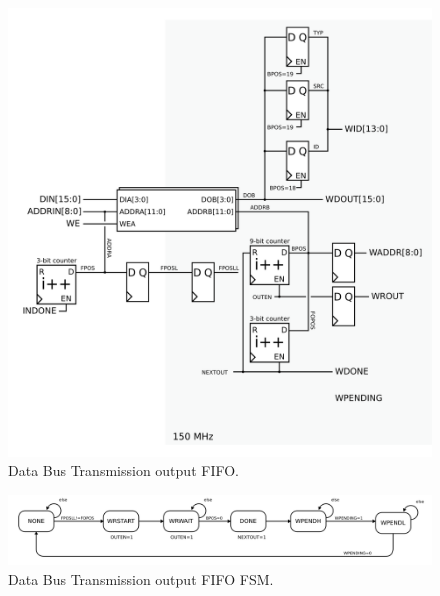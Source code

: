 \begin{figure}
\begin{centering}
\includegraphics[scale=0.8]{bufratelim.svg}
\end{centering}
\caption{Data Bus Transmission output FIFO.}
\label{data.outputfifo}
\end{figure}


\begin{figure}
\begin{centering}
\includegraphics[scale=0.8]{bufratelim.fsm.svg}
\end{centering}
\caption{Data Bus Transmission output FIFO FSM.}
\label{data.outputfifo}
\end{figure}


